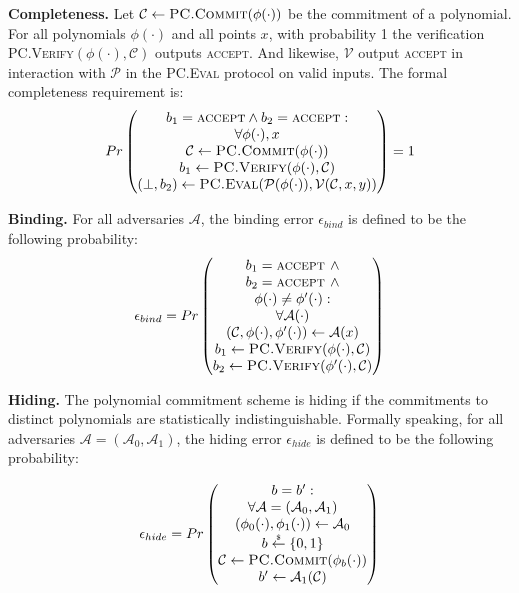 \textbf{Completeness.} Let $\mathcal{C} \leftarrow \textsc{PC.Commit}(\phi(\cdot))$ be the commitment of a polynomial. 
For all polynomials $\phi(\cdot)$ and all points $x$, with probability 1 the verification \textsc{PC.Verify}$(\phi(\cdot), \mathcal{C})$ outputs \textsc{accept}. And likewise, $\mathcal{V}$ output \textsc{accept} in interaction with $\mathcal{P}$ in the \textsc{PC.Eval} protocol on valid inputs. The formal completeness requirement is:
$$
Pr
\begin{pmatrix}
 b_1 = \textsc{accept} \wedge b_2 = \textsc{accept}: \\
 \forall \phi(\cdot), x \\
 \mathcal{C} \leftarrow \textsc{PC.Commit}(\phi(\cdot)) \\
 b_1 \leftarrow \textsc{PC.Verify}(\phi(\cdot), \mathcal{C}) \\
 (\perp, b_2)\leftarrow \textsc{PC.Eval}(\mathcal{P}(\phi(\cdot)), \mathcal{V}(\mathcal{C}, x, y))
\end{pmatrix}
= 1
$$


\textbf{Binding.} For all adversaries $\mathcal{A}$, the binding error $\epsilon_{bind}$ is defined to be the following probability:
$$
\epsilon_{bind} = Pr
\begin{pmatrix}
 b_1 = \textsc{accept } \wedge \\
 b_2 = \textsc{accept } \wedge \\
 \phi(\cdot) \neq \phi^\prime(\cdot): \\
 \forall \mathcal{A}(\cdot) \\
 (\mathcal{C}, \phi(\cdot), \phi^\prime(\cdot)) \leftarrow \mathcal{A}(x) \\
 b_1 \leftarrow \textsc{PC.Verify}(\phi(\cdot), \mathcal{C}) \\
 b_2 \leftarrow \textsc{PC.Verify}(\phi^\prime(\cdot), \mathcal{C})
\end{pmatrix}
$$



\textbf{Hiding.} The polynomial commitment scheme is hiding if the commitments to distinct polynomials are statistically indistinguishable. Formally speaking, for all adversaries $\mathcal{A} = (\mathcal{A}_0, \mathcal{A}_1)$, the hiding error $\epsilon_{hide}$ is defined to be the following probability:

$$
\epsilon_{hide} = Pr
\begin{pmatrix}
 b = b^\prime : \\
 \forall \mathcal{A} = (\mathcal{A}_0, \mathcal{A}_1) \\
 (\phi_0(\cdot), \phi_1(\cdot)) \leftarrow \mathcal{A}_0 \\
 b \overset{{\scriptscriptstyle\$}}{\leftarrow} \{0, 1\} \\
 \mathcal{C} \leftarrow \textsc{PC.Commit}(\phi_b(\cdot)) \\
 b^\prime \leftarrow \mathcal{A}_1(\mathcal{C})
\end{pmatrix}
$$


